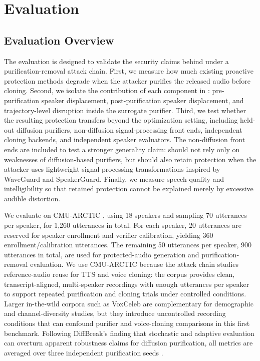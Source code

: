 \section{Evaluation}

\subsection{Evaluation Overview}

The evaluation is designed to validate the security claims behind \method{} under a purification-removal attack chain. 
First, we measure how much existing proactive protection methods degrade when the attacker purifies the released audio before cloning. 
Second, we isolate the contribution of each component in \method{}: pre-purification speaker displacement, post-purification speaker displacement, and trajectory-level disruption inside the surrogate purifier. 
Third, we test whether the resulting protection transfers beyond the optimization setting, including held-out diffusion purifiers, non-diffusion signal-processing front ends, independent cloning backends, and independent speaker evaluators. 
The non-diffusion front ends are included to test a stronger generality claim: \method{} should not rely only on weaknesses of diffusion-based purifiers, but should also retain protection when the attacker uses lightweight signal-processing transformations inspired by WaveGuard and SpeakerGuard. 
Finally, we measure speech quality and intelligibility so that retained protection cannot be explained merely by excessive audible distortion.

We evaluate on CMU-ARCTIC \cite{kominek2004cmuarctic}, using 18 speakers and sampling 70 utterances per speaker, for 1,260 utterances in total. 
For each speaker, 20 utterances are reserved for speaker enrollment and verifier calibration, yielding 360 enrollment/calibration utterances. 
The remaining 50 utterances per speaker, 900 utterances in total, are used for protected-audio generation and purification-removal evaluation. 
We use CMU-ARCTIC because the attack chain studies reference-audio reuse for TTS and voice cloning: the corpus provides clean, transcript-aligned, 
multi-speaker recordings with enough utterances per speaker to support repeated purification and cloning trials under controlled conditions. 
Larger in-the-wild corpora such as VoxCeleb are complementary for demographic and channel-diversity studies, 
but they introduce uncontrolled recording conditions that can confound purifier and voice-cloning comparisons in this first benchmark. 
Following DiffBreak's finding that stochastic and adaptive evaluation can overturn apparent robustness claims for diffusion purification, 
all metrics are averaged over three independent purification seeds \cite{kassis2025diffbreak}.

